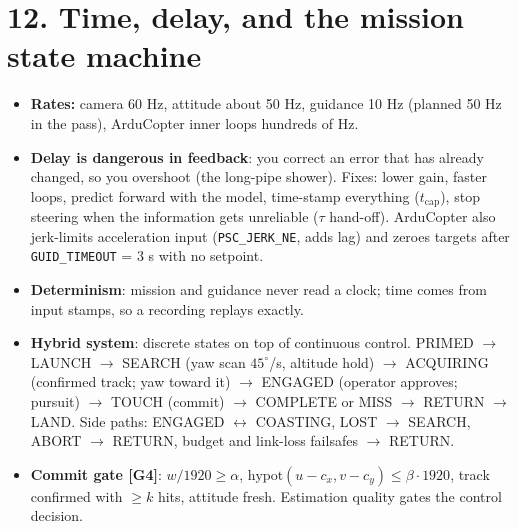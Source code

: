 \documentclass[10pt]{article}
\newcommand{\code}[1]{\textcolor{code}{\texttt{#1}}}
\begin{document}
\section*{12. Time, delay, and the mission state machine}
\begin{itemize}
\item \textbf{Rates:} camera 60 Hz, attitude about 50 Hz, guidance 10 Hz (planned 50 Hz in
the pass), ArduCopter inner loops hundreds of Hz.
\item \textbf{Delay is dangerous in feedback}: you correct an error that has already
changed, so you overshoot (the long-pipe shower). Fixes: lower gain, faster loops, predict
forward with the model, time-stamp everything ($t_\text{cap}$), stop steering when the
information gets unreliable ($\tau$ hand-off). ArduCopter also jerk-limits acceleration
input (\code{PSC\_JERK\_NE}, adds lag) and zeroes targets after \code{GUID\_TIMEOUT} = 3 s
with no setpoint.
\item \textbf{Determinism}: mission and guidance never read a clock; time comes from input
stamps, so a recording replays exactly.
\item \textbf{Hybrid system}: discrete states on top of continuous control.
PRIMED $\to$ LAUNCH $\to$ SEARCH (yaw scan $45^\circ$/s, altitude hold) $\to$ ACQUIRING
(confirmed track; yaw toward it) $\to$ ENGAGED (operator approves; pursuit) $\to$ TOUCH
(commit) $\to$ COMPLETE or MISS $\to$ RETURN $\to$ LAND. Side paths: ENGAGED
$\leftrightarrow$ COASTING, LOST $\to$ SEARCH, ABORT $\to$ RETURN, budget and link-loss
failsafes $\to$ RETURN.
\item \textbf{Commit gate [G4]}: $w/1920 \ge \alpha$, $\text{hypot}(u - c_x, v - c_y)
\le \beta\cdot 1920$, track confirmed with $\ge k$ hits, attitude fresh. Estimation
quality gates the control decision.
\end{itemize}
\end{document}

